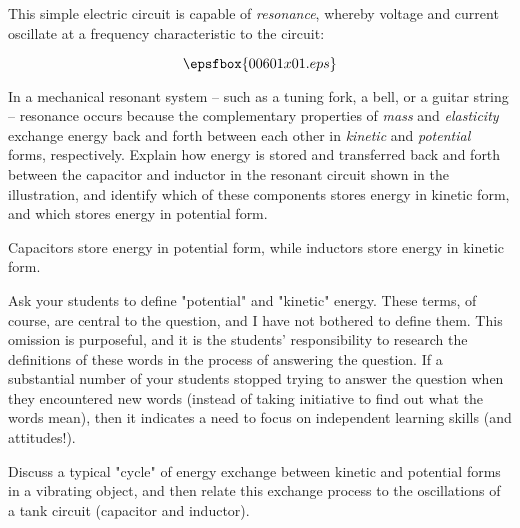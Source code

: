 

This simple electric circuit is capable of {\it resonance}, whereby voltage and current oscillate at a frequency characteristic to the circuit:

$$\epsfbox{00601x01.eps}$$

In a mechanical resonant system -- such as a tuning fork, a bell, or a guitar string -- resonance occurs because the complementary properties of {\it mass} and {\it elasticity} exchange energy back and forth between each other in {\it kinetic} and {\it potential} forms, respectively.  Explain how energy is stored and transferred back and forth between the capacitor and inductor in the resonant circuit shown in the illustration, and identify which of these components stores energy in kinetic form, and which stores energy in potential form.







Capacitors store energy in potential form, while inductors store energy in kinetic form.







Ask your students to define "potential" and "kinetic" energy.  These terms, of course, are central to the question, and I have not bothered to define them.  This omission is purposeful, and it is the students' responsibility to research the definitions of these words in the process of answering the question.  If a substantial number of your students stopped trying to answer the question when they encountered new words (instead of taking initiative to find out what the words mean), then it indicates a need to focus on independent learning skills (and attitudes!).

Discuss a typical "cycle" of energy exchange between kinetic and potential forms in a vibrating object, and then relate this exchange process to the oscillations of a tank circuit (capacitor and inductor).




